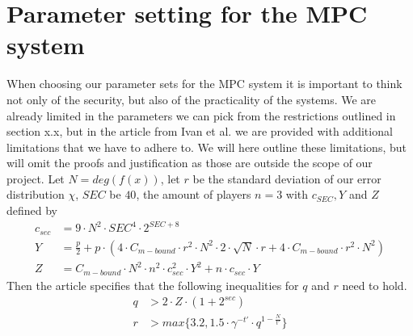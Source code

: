 \documentclass[../main.tex]{subfiles}
\begin{document}
\section{Parameter setting for the MPC system} \label{sec:choosing-parameters}
    When choosing our parameter sets for the MPC system it is important to think not only of the security, but also of
    the practicality of the systems.
    We are already limited in the parameters we can pick from the restrictions outlined in section x.x, but in the article \cite{damgaard2012multiparty} from Ivan et al. we are provided with additional limitations that we have to adhere to.
    We will here outline these limitations, but will omit the proofs and justification as those are outside the scope of our project.
    Let $N = deg(f(x))$, let $r$ be the standard deviation of our error distribution $\chi$, $SEC$ be $40$, the amount of players $n = 3$ with $c_{SEC}, Y$ and $Z$ defined by
    \begin{align*}
        c_{sec} &= 9 \cdot N^2 \cdot SEC^4 \cdot 2^{SEC + 8} \\
        Y       &= \frac{p}{2} + p \cdot (4 \cdot C_{m-bound} \cdot r^2 \cdot N^2 \cdot 2 \cdot \sqrt{N} \cdot r + 4 \cdot C_{m-bound} \cdot r^2 \cdot N^2) \\
        Z       &= C_{m-bound} \cdot N^2 \cdot n^2 \cdot c_{sec}^2 \cdot Y^2 + n \cdot c_{sec} \cdot Y
    \end{align*}
    Then the article specifies that the following inequalities for $q$ and $r$ need to hold.
    \begin{align*}
        q   &> 2 \cdot Z \cdot (1 + 2^{sec}) \\
        r   &> max\{3.2, 1.5 \cdot \gamma^{-t'} \cdot q^{1 - \frac{N}{t'}}\}
    \end{align*}
\end{document}
